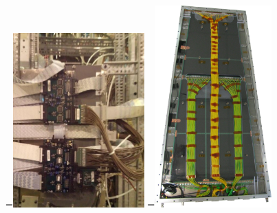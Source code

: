 \begin{figure}[ht]
	\centering
	=\hbox{\includegraphics[width=0.45\textwidth]{GLA/FEBplexis.png}}%
	=\hbox{\includegraphics[width=0.40\textwidth]{GLA/ChamberFloat.png}}%
	{\,} \hfill
	 \hfill

\end{figure}
